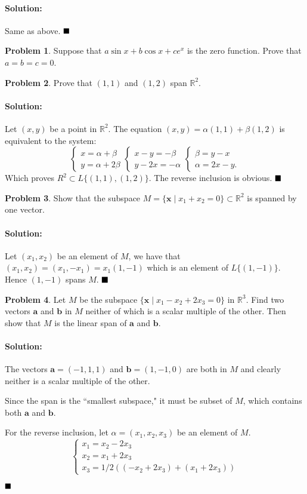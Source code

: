 \documentclass[]{article}
\newcommand{\RR}{\mathbb{R}}
\theoremstyle{definition}
\newtheorem{problem}{Problem}
\newenvironment{solution}{\paragraph{Solution:}}{\hfill$\blacksquare \\$}
\begin{document}
\begin{solution}
	Same as above.
\end{solution}
\begin{problem}
Suppose that  $a \sin x + b \cos x + c e^x$ is the zero function. Prove that  $a = b = c = 0$.    	
\end{problem}
\begin{problem}
	Prove that  $(1,1)$ and  $(1,2)$  span  $\RR^2$.
\end{problem}
\begin{solution}
	Let $(x,y)$ be a point in $\RR^2$. The equation $(x,y) = \alpha (1,1) + \beta (1,2)$ is equivalent to the system:
	\[
	\begin{cases}
		x = \alpha + \beta \\
		y = \alpha + 2\beta
	\end{cases}
	\begin{cases}
		x - y = -\beta \\
		y - 2x = -\alpha
	\end{cases}
	\begin{cases}
		\beta = y-x \\
		\alpha = 2x - y.
	\end{cases}
\]
	Which proves $R^2 \subset L\{(1,1), (1,2)\} $. The reverse inclusion is obvious.
\end{solution}
\begin{problem}
	Show that the subspace $M = \{\mathbf{x} \mid x_1 + x_2 = 0 \} \subset \RR^2$ is spanned by one vector. 
\end{problem}
\begin{solution}
Let $(x_1, x_2)$ be an element of $M$, we have that $(x_1, x_2) = (x_1, -x_1) = x_1(1, -1)$ which is an element of $L\{(1,-1)\}$. Hence $(1,-1)$ spans $M$.
\end{solution}
\begin{problem}
	Let $M$ be the subspace $\{\mathbf{x} \mid x_1 - x_2 + 2x_3 = 0 \}$ in $\RR^3$. Find two vectors $\mathbf{a}$ and $\mathbf{b}$ in $M$ neither of which is a scalar multiple of the other. Then show that $M$ is the linear span of $\mathbf{a}$ and $\mathbf{b}$.
\end{problem}
\begin{solution}
	The vectors $\mathbf{a} = (-1,1,1)$ and $\mathbf{b} = (1,-1,0)$ are both in $M$ and clearly neither is a scalar multiple of the other. \par
	Since the span is the ``smallest subspace," it must be subset of $M$, which contains both $\mathbf{a}$ and $\mathbf{b}$. \par For the reverse inclusion, let $\alpha = (x_1, x_2, x_3)$ be an element of $M$.  
	\[
	\begin{cases}
		x_1 =x_2 -2x_3 \\
		x_2 = x_1 + 2x_3 \\
		x_3 = 1/2 ((-x_2+2x_3) + (x_1 + 2x_3)) 
	\end{cases}
	\]
	
\end{solution}
\end{document}
